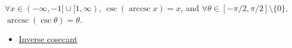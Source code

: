 \begin{remark*}
$\forall x\in(-\infty,-1]\cup[1,\infty)$, $\csc(\operatorname{arccsc} x)=x$, and
$\forall \theta\in[-\pi/2,\pi/2]\setminus\{0\}$,
$\operatorname{arccsc}(\csc\theta)=\theta$.
\end{remark*}
\begin{dependencies}
\begin{itemize}
  \item \hyperref[def:inverse-cosecant]{Inverse cosecant}
\end{itemize}
\end{dependencies}
